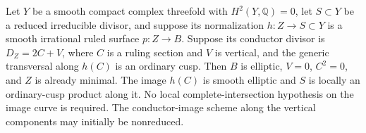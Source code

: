 
\begin{proposition}\label{cdp:st:A.5.10}
Let $Y$ be a smooth compact complex threefold with
$H^2(Y,\mathbb Q)=0$, let $S\subset Y$ be a reduced
irreducible divisor, and suppose its normalization
$h:Z\to S\subset Y$ is a smooth irrational
ruled surface $p:Z\to B$.
Suppose its conductor divisor is $D_Z=2C+V$, where
$C$ is a ruling section and $V$ is vertical, and
the generic transversal along $h(C)$ is an ordinary cusp.
Then $B$ is elliptic, $V=0$, $C^2=0$, and $Z$ is
already minimal.
The image $h(C)$ is smooth elliptic and $S$ is locally
an ordinary-cusp product along it. No local
complete-intersection hypothesis on the image curve is
required. The conductor-image scheme along the vertical
components may initially be nonreduced.
\end{proposition}

